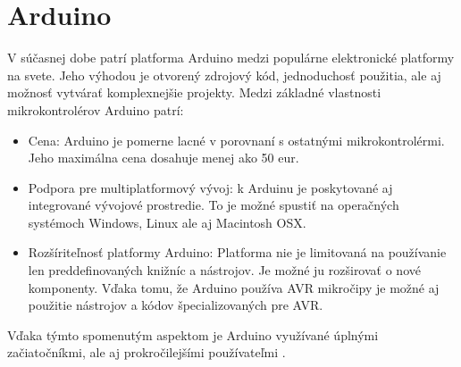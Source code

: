 \section{Arduino}
\noindent \par
V súčasnej dobe patrí platforma Arduino medzi populárne elektronické platformy na svete.
Jeho výhodou je otvorený zdrojový kód, jednoduchosť použitia, ale aj možnosť vytvárať komplexnejšie projekty.
Medzi základné vlastnosti mikrokontrolérov Arduino patrí:

\begin{itemize}
    \item Cena: Arduino je pomerne lacné v porovnaní s ostatnými mikrokontrolérmi. Jeho maximálna cena dosahuje menej ako 50 eur.
    \item Podpora pre multiplatformový vývoj: k Arduinu je poskytované aj integrované vývojové prostredie. To je možné spustiť na operačných systémoch Windows, Linux
          ale aj Macintosh OSX.
    \item Rozšíriteľnosť platformy Arduino: Platforma nie je limitovaná na používanie len preddefinovaných knižníc a nástrojov. Je možné ju rozširovať o nové komponenty. Vďaka tomu, že Arduino používa AVR mikročipy je možné aj použitie nástrojov a kódov špecializovaných pre AVR.
\end{itemize}

Vďaka týmto spomenutým aspektom je Arduino využívané úplnými začiatočníkmi, ale aj prokročilejšími používateľmi \cite{WhatArduinoArduino}.